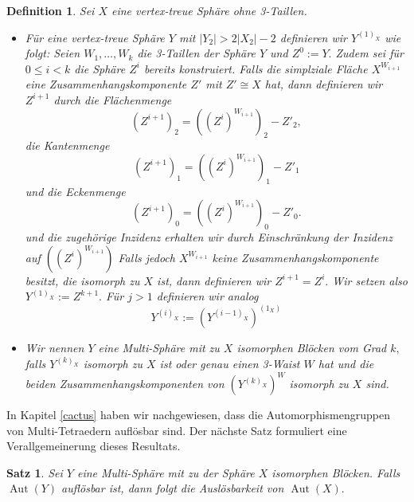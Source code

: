 \documentclass[12pt,titlepage,twoside,cleardoublepage]{article}
\theoremstyle{nummermitklammern}
\newtheorem{definition}[temp]{Definition}
\newtheorem{satz}[temp]{Satz}
\newtheorem{definition}[zahl]{Definition}
\newtheorem{satz}[zahl]{Satz}
\numberwithin{equation}{section}
\DeclareMathOperator{\Aut}{Aut}
\begin{document}
\begin{definition}
Sei $X$ eine vertex-treue Sphäre ohne 3-Taillen.
\begin{itemize}
\item Für eine vertex-treue Sphäre $Y$ mit $\vert Y_2 \vert > 2\vert X_2 \vert-2$ definieren wir $Y^{(1)_X}$ wie folgt:
Seien $W_1,\ldots,W_k$ die 3-Taillen der Sphäre $Y$ und $Z^0:=Y.$ 
Zudem sei für $0\leq i < k$ die Sphäre $Z^i$ bereits konstruiert.
Falls die simplziale Fläche $X^{W_{i+1}}$ eine Zusammenhangskomponente $Z'$ mit $Z'\cong X$ hat, dann definieren wir $Z^{i+1}$ durch die Flächenmenge 
\[
(Z^{i+1})_2=((Z^{i})^{W_{i+1}})_2-Z'_2,
\]
die Kantenmenge
\[
(Z^{i+1})_1=((Z^{i})^{W_{i+1}})_1-Z'_1
\]
und die Eckenmenge 
\[
(Z^{i+1})_0=((Z^{i})^{W_{i+1}})_0-Z'_0.
\]
und die zugehörige Inzidenz erhalten wir durch Einschränkung der Inzidenz auf $((Z^{i})^{W_{i+1}})$
Falls jedoch $X^{W_{i+1}}$ keine Zusammenhangskomponente besitzt, die isomorph zu $X$ ist, dann definieren wir $Z^{i+1}=Z^i.$ Wir setzen also $Y^{(1)_X}:=Z^{k+1}.$ 
Für $j>1$ definieren wir analog 
\[
Y^{(i)_X}:={(Y^{(i-1)_X})}^{(1_X)}
\]
\item Wir nennen $Y$ eine Multi-Sphäre mit zu $X$ isomorphen Blöcken vom Grad $k,$ falls $Y^{(k)_X}$ isomorph zu $X$ ist oder genau einen 3-Waist $W$ hat und die beiden Zusammenhangskomponenten von $(Y^{(k)_X})^W$ isomorph zu $X$ sind.
\end{itemize}
\end{definition}
In Kapitel \ref{cactus} haben wir nachgewiesen, dass die Automorphismengruppen von Multi-Tetraedern auflösbar sind. Der nächste Satz formuliert eine Verallgemeinerung dieses Resultats. 
\begin{satz}
Sei $Y$ eine Multi-Sphäre mit zu der Sphäre $X$ isomorphen Blöcken. Falls $\Aut(Y)$ auflösbar ist, dann folgt die Auslösbarkeit von $\Aut(X).$ 
\end{satz}
\end{document}
